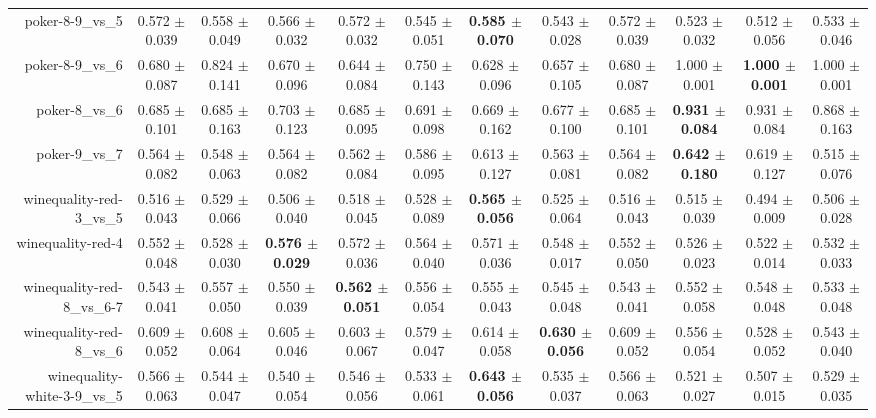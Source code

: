 \begin{table}[!ht]
{\begin{tabular}{r c c c c c c c c c c c}
poker-8-9\_vs\_5 & 0.572 $\pm$ 0.039 & 0.558 $\pm$ 0.049 & 0.566 $\pm$ 0.032 & 0.572 $\pm$ 0.032 & 0.545 $\pm$ 0.051 & \textbf{0.585 $\pm$ 0.070} & 0.543 $\pm$ 0.028 & 0.572 $\pm$ 0.039 & 0.523 $\pm$ 0.032 & 0.512 $\pm$ 0.056 & 0.533 $\pm$ 0.046 \\
poker-8-9\_vs\_6 & 0.680 $\pm$ 0.087 & 0.824 $\pm$ 0.141 & 0.670 $\pm$ 0.096 & 0.644 $\pm$ 0.084 & 0.750 $\pm$ 0.143 & 0.628 $\pm$ 0.096 & 0.657 $\pm$ 0.105 & 0.680 $\pm$ 0.087 & 1.000 $\pm$ 0.001 & \textbf{1.000 $\pm$ 0.001} & 1.000 $\pm$ 0.001 \\
poker-8\_vs\_6 & 0.685 $\pm$ 0.101 & 0.685 $\pm$ 0.163 & 0.703 $\pm$ 0.123 & 0.685 $\pm$ 0.095 & 0.691 $\pm$ 0.098 & 0.669 $\pm$ 0.162 & 0.677 $\pm$ 0.100 & 0.685 $\pm$ 0.101 & \textbf{0.931 $\pm$ 0.084} & 0.931 $\pm$ 0.084 & 0.868 $\pm$ 0.163 \\
poker-9\_vs\_7 & 0.564 $\pm$ 0.082 & 0.548 $\pm$ 0.063 & 0.564 $\pm$ 0.082 & 0.562 $\pm$ 0.084 & 0.586 $\pm$ 0.095 & 0.613 $\pm$ 0.127 & 0.563 $\pm$ 0.081 & 0.564 $\pm$ 0.082 & \textbf{0.642 $\pm$ 0.180} & 0.619 $\pm$ 0.127 & 0.515 $\pm$ 0.076 \\
winequality-red-3\_vs\_5 & 0.516 $\pm$ 0.043 & 0.529 $\pm$ 0.066 & 0.506 $\pm$ 0.040 & 0.518 $\pm$ 0.045 & 0.528 $\pm$ 0.089 & \textbf{0.565 $\pm$ 0.056} & 0.525 $\pm$ 0.064 & 0.516 $\pm$ 0.043 & 0.515 $\pm$ 0.039 & 0.494 $\pm$ 0.009 & 0.506 $\pm$ 0.028 \\
winequality-red-4 & 0.552 $\pm$ 0.048 & 0.528 $\pm$ 0.030 & \textbf{0.576 $\pm$ 0.029} & 0.572 $\pm$ 0.036 & 0.564 $\pm$ 0.040 & 0.571 $\pm$ 0.036 & 0.548 $\pm$ 0.017 & 0.552 $\pm$ 0.050 & 0.526 $\pm$ 0.023 & 0.522 $\pm$ 0.014 & 0.532 $\pm$ 0.033 \\
winequality-red-8\_vs\_6-7 & 0.543 $\pm$ 0.041 & 0.557 $\pm$ 0.050 & 0.550 $\pm$ 0.039 & \textbf{0.562 $\pm$ 0.051} & 0.556 $\pm$ 0.054 & 0.555 $\pm$ 0.043 & 0.545 $\pm$ 0.048 & 0.543 $\pm$ 0.041 & 0.552 $\pm$ 0.058 & 0.548 $\pm$ 0.048 & 0.533 $\pm$ 0.048 \\
winequality-red-8\_vs\_6 & 0.609 $\pm$ 0.052 & 0.608 $\pm$ 0.064 & 0.605 $\pm$ 0.046 & 0.603 $\pm$ 0.067 & 0.579 $\pm$ 0.047 & 0.614 $\pm$ 0.058 & \textbf{0.630 $\pm$ 0.056} & 0.609 $\pm$ 0.052 & 0.556 $\pm$ 0.054 & 0.528 $\pm$ 0.052 & 0.543 $\pm$ 0.040 \\
winequality-white-3-9\_vs\_5 & 0.566 $\pm$ 0.063 & 0.544 $\pm$ 0.047 & 0.540 $\pm$ 0.054 & 0.546 $\pm$ 0.056 & 0.533 $\pm$ 0.061 & \textbf{0.643 $\pm$ 0.056} & 0.535 $\pm$ 0.037 & 0.566 $\pm$ 0.063 & 0.521 $\pm$ 0.027 & 0.507 $\pm$ 0.015 & 0.529 $\pm$ 0.035 \\

\end{tabular}}
\end{table}
